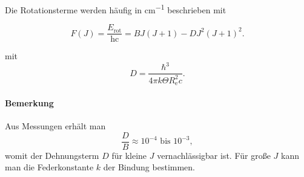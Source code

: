 	Die Rotationsterme werden häufig in \unit{\centi\meter ^{-1}} beschrieben mit
	\begin{important}
		\begin{equation}
			\label{eq:4.28}
			F(J) = \frac{ E_{\text{rot}}}{\mathrm{hc}} = B J\left( J+1 \right) - DJ^2 \left( J+1 \right) ^2.	
		\end{equation}
	\end{important}
	
	mit
	$$D=\frac{\hbar^3}{4\pi k\Theta R_\mathrm e^2c}.$$

\paragraph{Bemerkung}
	Aus Messungen erhält man
	$$
	\frac{D}{B} \approx 10^{-4} \text{ bis } 10^{-3},
	$$
	womit der Dehnungsterm $D$ für kleine $J$ vernachlässigbar ist.
	Für große $J$ kann man die Federkonstante $k$ der Bindung bestimmen.\\

